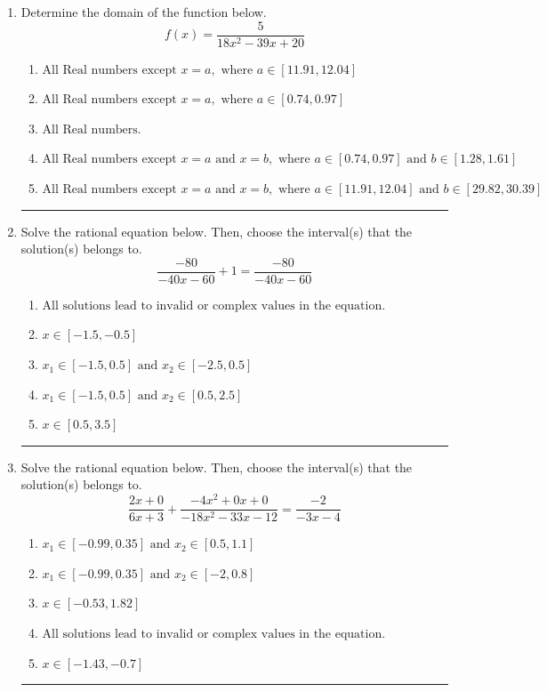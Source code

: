 \documentclass[14pt]{extbook}
\newcommand{\litem}[1]{\item#1\hspace*{-1cm}\rule{\textwidth}{0.4pt}}
\begin{document}
\begin{enumerate}
\litem{
Determine the domain of the function below.\[ f(x) = \frac{5}{18x^{2} -39 x + 20} \]\begin{enumerate}[label=\Alph*.]
\item \( \text{All Real numbers except } x = a, \text{ where } a \in [11.91, 12.04] \)
\item \( \text{All Real numbers except } x = a, \text{ where } a \in [0.74, 0.97] \)
\item \( \text{All Real numbers.} \)
\item \( \text{All Real numbers except } x = a \text{ and } x = b, \text{ where } a \in [0.74, 0.97] \text{ and } b \in [1.28, 1.61] \)
\item \( \text{All Real numbers except } x = a \text{ and } x = b, \text{ where } a \in [11.91, 12.04] \text{ and } b \in [29.82, 30.39] \)

\end{enumerate} }
\litem{
Solve the rational equation below. Then, choose the interval(s) that the solution(s) belongs to.\[ \frac{-80}{-40x -60} + 1 = \frac{-80}{-40x -60} \]\begin{enumerate}[label=\Alph*.]
\item \( \text{All solutions lead to invalid or complex values in the equation.} \)
\item \( x \in [-1.5,-0.5] \)
\item \( x_1 \in [-1.5, 0.5] \text{ and } x_2 \in [-2.5,0.5] \)
\item \( x_1 \in [-1.5, 0.5] \text{ and } x_2 \in [0.5,2.5] \)
\item \( x \in [0.5,3.5] \)

\end{enumerate} }
\litem{
Solve the rational equation below. Then, choose the interval(s) that the solution(s) belongs to.\[ \frac{2x + 0}{6x + 3} + \frac{-4x^{2} +0 x + 0}{-18x^{2} -33 x -12} = \frac{-2}{-3x -4} \]\begin{enumerate}[label=\Alph*.]
\item \( x_1 \in [-0.99, 0.35] \text{ and } x_2 \in [0.5,1.1] \)
\item \( x_1 \in [-0.99, 0.35] \text{ and } x_2 \in [-2,0.8] \)
\item \( x \in [-0.53,1.82] \)
\item \( \text{All solutions lead to invalid or complex values in the equation.} \)
\item \( x \in [-1.43,-0.7] \)


\end{enumerate}}
\end{enumerate}
\end{document}

